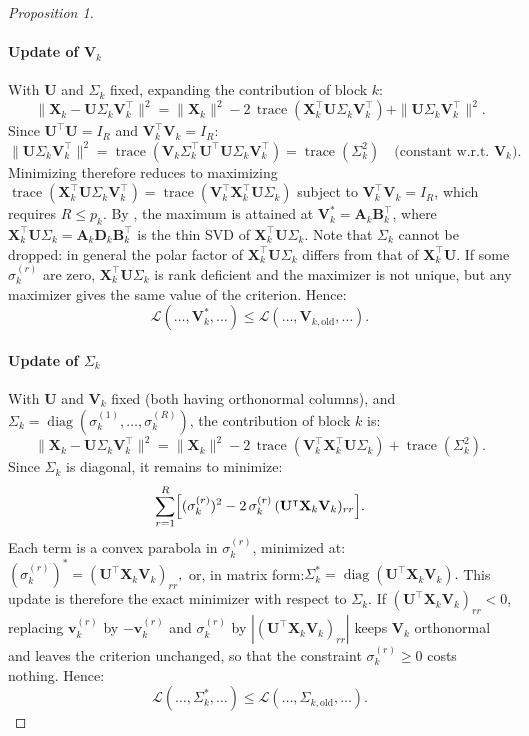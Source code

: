 \documentclass[11pt]{article}
\newcommand{\X}{\mathbf{X}}
\newcommand{\U}{\mathbf{U}}
\newcommand{\V}{\mathbf{V}}
\newcommand{\vv}{\mathbf{v}}
\begin{document}
\begin{proof}[Proposition 1]
\paragraph{Update of $\V_k$} With $\U$ and $\Sigma_k$ fixed, expanding the contribution of block $k$:
\[
  \|\X_k - \U \Sigma_k \V_k^\intercal\|^2
  = \|\X_k\|^2
    - 2\,\operatorname{trace}(\X_k^\intercal \U \Sigma_k \V_k^\intercal)
    + \|\U \Sigma_k \V_k^\intercal\|^2.
\]
Since $\U^\intercal \U = I_R$ and $\V_k^\intercal \V_k = I_R$:
\[
  \|\U \Sigma_k \V_k^\intercal\|^2
  = \operatorname{trace}(\V_k \Sigma_k^\intercal \U^\intercal \U \Sigma_k \V_k^\intercal)
  = \operatorname{trace}(\Sigma_k^2)
  \quad \text{(constant w.r.t.\ } \V_k\text{)}.
\]
Minimizing therefore reduces to maximizing
$\operatorname{trace}(\X_k^\intercal \U \Sigma_k \V_k^\intercal) = \operatorname{trace}(\V_k^\intercal\X_k^\intercal\U\Sigma_k)$
subject to $\V_k^\intercal \V_k = I_R$, which requires $R\leq p_k$. By \cite{cliff1966}, the maximum is attained at $\V_k^* = \mathbf A_k\mathbf B_k^\intercal$, where $\X_k^\intercal\U\Sigma_k=\mathbf A_k\mathbf D_k\mathbf B_k^\intercal$ is the thin SVD of $\X_k^\intercal\U\Sigma_k$. Note that $\Sigma_k$ cannot be dropped: in general the polar factor of $\X_k^\intercal\U\Sigma_k$ differs from that of $\X_k^\intercal\U$. If some $\sigma_k^{(r)}$ are zero, $\X_k^\intercal\U\Sigma_k$ is rank deficient and the maximizer is not unique, but any maximizer gives the same value of the criterion. Hence:
\[
  \mathcal{L}(\ldots, \V_k^*, \ldots) \leq \mathcal{L}(\ldots, \V_{k,\mathrm{old}}, \ldots).
\]

\paragraph{Update of $\Sigma_k$} With $\U$ and $\V_k$ fixed (both having orthonormal columns), and $\Sigma_k = \operatorname{diag}(\sigma^{(1)}_k,
\ldots, \sigma^{(R)}_k)$, the contribution of block $k$ is:
\[
  \|\X_k - \U \Sigma_k \V_k^\intercal\|^2
  = \|\X_k\|^2
    - 2\,\operatorname{trace}(\V_k^\intercal \X_k^\intercal \U \Sigma_k)
    + \operatorname{trace}(\Sigma_k^2).
\]
Since $\Sigma_k$ is diagonal, it remains to minimize:
\[
  \sum_{r=1}^{R} \Bigl[ (\sigma^{(r)}_k)^2 - 2\,\sigma^{(r)}_k\,(\U^\intercal \X_k \V_k)_{rr} \Bigr].
\]
Each term is a convex parabola in $\sigma^{(r)}_k$, minimized at: $(\sigma^{(r)}_k)^* = (\U^\intercal \X_k \V_k)_{rr},$ or, in matrix form:$\Sigma_k^* = \operatorname{diag}(\U^\intercal \X_k \V_k).$
This update is therefore the exact minimizer with respect to $\Sigma_k$. If $(\U^\intercal\X_k\V_k)_{rr}<0$, replacing $\vv_k^{(r)}$ by $-\vv_k^{(r)}$ and $\sigma_k^{(r)}$ by $|(\U^\intercal\X_k\V_k)_{rr}|$ keeps $\V_k$ orthonormal and leaves the criterion unchanged, so that the constraint $\sigma_k^{(r)}\geq0$ costs nothing. Hence:
\[
  \mathcal{L}(\ldots, \Sigma_k^*, \ldots) \leq \mathcal{L}(\ldots, \Sigma_{k,\mathrm{old}}, \ldots).
\]


\end{proof}
\end{document}
